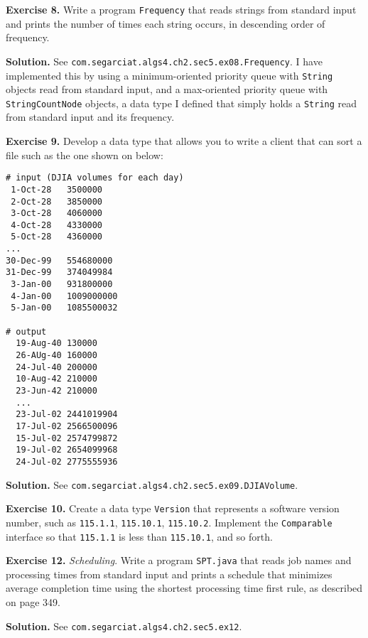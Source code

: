 \documentclass[12pt, a4paper]{article}
\newenvironment{ex}[2][Exercise]
{\par\medskip\noindent \textbf{#1 #2.}}
{\medskip}
\newenvironment{sol}[1][Solution]
{\par\medskip\noindent \textbf{#1.} }
{\medskip}
\begin{document}
	\begin{ex}{8}
		Write a program \texttt{Frequency} that reads strings from standard input and
		prints the number of times each string occurs, in descending order of frequency.
	\end{ex}
	\begin{sol}
		See \texttt{com.segarciat.algs4.ch2.sec5.ex08.Frequency}. I have implemented
		this by using a minimum-oriented priority queue with \texttt{String} objects
		read from standard input, and a max-oriented priority queue with \texttt{StringCountNode}
		objects, a data type I defined that simply holds a \texttt{String} read from
		standard input and its frequency.
	\end{sol}
	\begin{ex}{9}
		Develop a data type that allows you to write a client that can sort a file
		such as the one shown on below:
		\begin{lstlisting}[language={}]
# input (DJIA volumes for each day)
 1-Oct-28	3500000
 2-Oct-28	3850000
 3-Oct-28	4060000
 4-Oct-28	4330000
 5-Oct-28	4360000
...
30-Dec-99	554680000
31-Dec-99	374049984
 3-Jan-00	931800000
 4-Jan-00	1009000000
 5-Jan-00	1085500032
 
# output
  19-Aug-40 130000
  26-AUg-40	160000
  24-Jul-40	200000
  10-Aug-42 210000
  23-Jun-42 210000
  ...
  23-Jul-02 2441019904
  17-Jul-02 2566500096
  15-Jul-02 2574799872
  19-Jul-02 2654099968
  24-Jul-02 2775555936
		\end{lstlisting}
	\end{ex}
	\begin{sol}
		See \texttt{com.segarciat.algs4.ch2.sec5.ex09.DJIAVolume}.
	\end{sol}
	\begin{ex}{10}
		Create a data type \texttt{Version} that represents a software version number,
		such as \texttt{115.1.1}, \texttt{115.10.1}, \texttt{115.10.2}. Implement
		the \texttt{Comparable} interface so that \texttt{115.1.1} is less than
		\texttt{115.10.1}, and so forth.
	\end{ex}
	\begin{ex}{12}
		\emph{Scheduling}. Write a program \texttt{SPT.java} that reads job names and
		processing times from standard input and prints a schedule that minimizes
		average completion time using the shortest processing time first rule, as described
		on page 349.
	\end{ex}
	\begin{sol}
		See \texttt{com.segarciat.algs4.ch2.sec5.ex12}.
	\end{sol}
\end{document}
